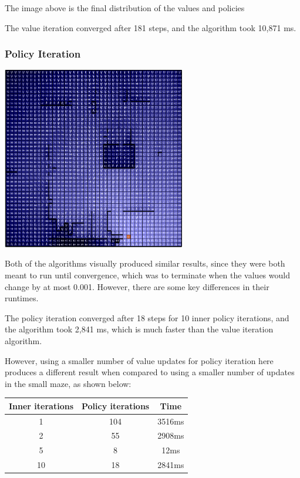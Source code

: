 \documentclass[11pt]{article}
\begin{document}
            The image above is the final
            distribution of the values and policies

            The value iteration converged after 181 steps, and the algorithm
            took 10,871 ms.

            \subsubsection{Policy Iteration}

            \includegraphics[width=8cm]{../images/large/pi.PNG}

            Both of the algorithms visually produced similar results, since they
            were both meant to run until convergence, which was to terminate
            when the values would change by at most 0.001. However, there are
            some key differences in their runtimes.

            The policy iteration converged after 18 steps for 10 inner
            policy iterations, and the algorithm
            took 2,841 ms, which is much faster than the value iteration algorithm.

            However, using a smaller number of value updates for policy iteration here produces
            a different result when compared to using a smaller number of updates in the
            small maze, as shown below:

            \begin{tabular}{c c c}
                Inner iterations & Policy iterations & Time \\ \hline
                1 & 104 & 3516ms \\ \hline
                2 & 55 & 2908ms \\ \hline
                5 & 8 & 12ms \\ \hline
                10 & 18 & 2841ms \\ \hline

            \end{tabular}
\end{document}
